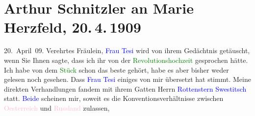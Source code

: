 

               \section[Arthur Schnitzler an Marie Herzfeld, 20. 4. 1909]{ Arthur Schnitzler an Marie Herzfeld, 20. 4. 1909}\nopagebreak{}\rehead{ }\normalsize\beginnumbering{} \toendnotes[C]{\smallbreak\pagebreak[2]} 
\toendnotes[C]{\smallbreak}\pstart
           \raggedleft{}{\pb}20. April 09.\pend
           \pstart{}Verehrtes Fräulein,\pend\pstart
           \textcolor{blue}{Frau Tesi}{}\ledrightnote{\textcolor{blue}{Anna Rotenstern-Tesi}} wird von ihrem Gedächtnis getäuscht,
               wenn Sie Ihnen sagte, dass ich ihr von der \textcolor{green}{Revolutionshochzeit}{}\ledrightnote{\textcolor{green}{Revolutionsbryllup. Skuespil i tre Akter}} gesprochen hätte. Ich habe von dem \textcolor{green}{Stück}{} schon das beste gehört, habe es aber
               bisher weder gelesen noch gesehen. Dass \textcolor{blue}{Frau Tesi}{}\ledrightnote{\textcolor{blue}{Anna Rotenstern-Tesi}}
               einiges von mir übersetzt hat stimmt. Meine direkten Verhandlungen fandem mit ihrem
               Gatten Herrn \textcolor{blue}{Rottenstern Swestitsch}{}\ledrightnote{\textcolor{blue}{Peter Rotenstern}} statt. \textcolor{blue}{Beide}{} scheinen mir, soweit
               es die Konventionsverhältnisse zwischen \textcolor{pink}{Oesterreich}{}\ledrightnote{\textcolor{pink}{Österreich}} und \textcolor{pink}{Russland}{}\ledrightnote{\textcolor{pink}{Russland}} zulassen,
